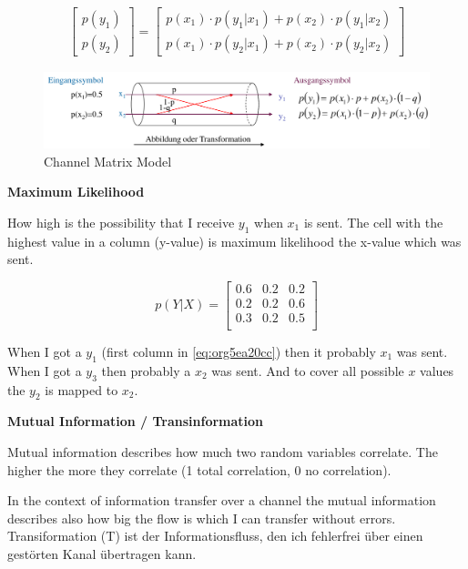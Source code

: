 \documentclass[11pt,twoside,twocolumn,landscape]{article}
\begin{document}
\begin{align}
  \begin{bmatrix}
    p(y_1) \\
    p(y_2)
  \end{bmatrix}
  = 
  \begin{bmatrix}
    p(x_1) \cdot p(y_1 | x_1) + p(x_2) \cdot p(y_1|x_2) \\
    p(x_1) \cdot p(y_2 | x_1) + p(x_2) \cdot p(y_2|x_2)
  \end{bmatrix}
\end{align}

\begin{figure}[htbp]
\centering
\includegraphics[width=.9\linewidth]{img/kanalmatrix_modell.png}
\caption{\label{fig:orgc777491}Channel Matrix Model}
\end{figure}

\textbf{Maximum Likelihood}

How high is the possibility that I receive \(y_1\) when \(x_1\) is sent.
The cell with the highest value in a column (y-value) is maximum likelihood the x-value which was sent.

\begin{equation}
\label{eq:org5ea20cc}
  p(Y|X) =
  \begin{bmatrix}
    0.6 & 0.2 & 0.2 \\
    0.2 & 0.2 & 0.6 \\
    0.3 & 0.2 & 0.5 \\
  \end{bmatrix}
\end{equation}

When I got a \(y_1\) (first column in \ref{eq:org5ea20cc}) then it probably \(x_1\) was sent.
When I got a \(y_3\) then probably a \(x_2\) was sent.
And to cover all possible \(x\) values the \(y_2\) is mapped to \(x_2\).

\textbf{Mutual Information / Transinformation}

Mutual information describes how much two random variables correlate.
The higher the more they correlate (1 total correlation, 0 no correlation).

In the context of information transfer over a channel the mutual information describes also how big the flow is which I can transfer without errors.
Transiformation (T) ist der Informationsfluss, den ich fehlerfrei über einen gestörten Kanal übertragen kann.
\end{document}
